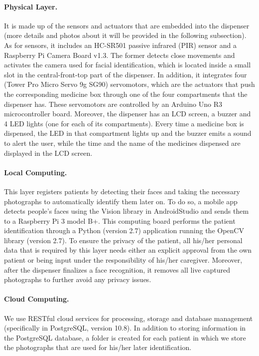 \documentclass{IOS-Book-Article}
\begin{document}
\paragraph{Physical Layer. }
It is made up of the sensors and actuators that are embedded into the dispenser (more details and photos about it will be provided in the following subsection). As for sensors, it includes an HC-SR501 passive infrared (PIR) sensor and a Raspberry Pi Camera Board v1.3. The former detects close movements and activates the camera used for facial identification, which is located inside a small slot in the central-front-top part of the dispenser. In addition, it integrates four (Tower Pro Micro Servo 9g SG90) servomotors, which are the actuators that push the corresponding medicine box through one of the four compartments that the dispenser has. These servomotors are controlled by an Arduino Uno R3 microcontroller board. Moreover, the dispenser has an LCD screen, a buzzer and 4 LED lights (one for each of its compartments). Every time a medicine box is dispensed, the LED in that compartment lights up and the buzzer emits a sound to alert the user, while the time and the name of the medicines dispensed are displayed in the LCD screen.

\paragraph{Local Computing. }

This layer registers patients by detecting their faces and taking the necessary photographs to automatically identify them later on. To do so, a mobile app detects people’s faces using the Vision library in AndroidStudio and sends them to a Raspberry Pi 3 model B+. This computing board performs the patient identification through a Python  (version 2.7) application running the OpenCV library (version 2.7). To ensure the privacy of the patient, all his/her personal data that is required by this layer needs either an explicit approval from the own patient or being input under the responsibility of his/her caregiver. Moreover, after the dispenser finalizes a face recognition, it removes all live captured photographs to further avoid any privacy issues.

\paragraph{Cloud Computing. }
We use RESTful cloud services for processing, storage and database management (specifically in PostgreSQL, version 10.8). In addition to storing information in the PostgreSQL database, a folder is created for each patient in which we store the photographs that are used for his/her later identification.
\end{document}
